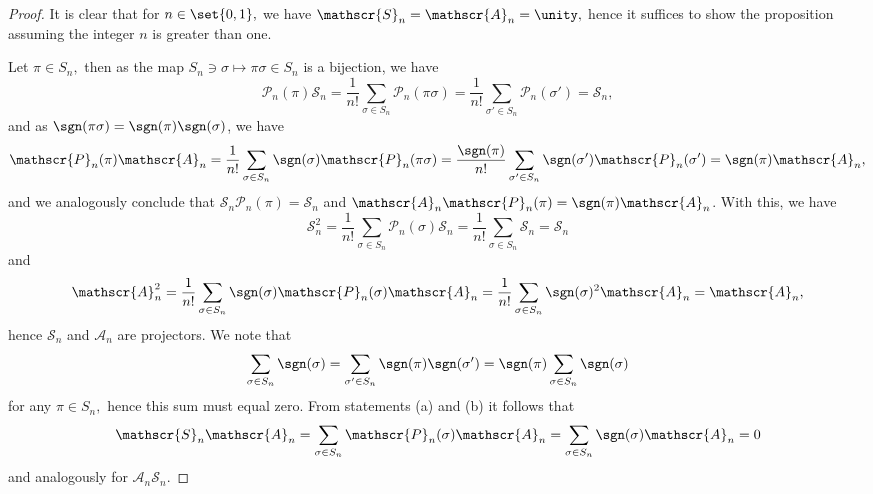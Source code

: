 \begin{proof}
    It is clear that for \(n \in \set{0,1},\) we have \(\mathscr{S}_n = \mathscr{A}_n = \unity,\) hence it suffices to show the proposition assuming the integer \(n\) is greater than one.

    Let \(\pi \in S_n,\) then as the map \(S_n \ni \sigma \mapsto \pi \sigma \in S_n\) is a bijection, we have
    \begin{equation*}
        \mathscr{P}_n(\pi) \mathscr{S}_n = \frac1{n!} \sum_{\sigma \in S_n}{\mathscr{P}_n(\pi\sigma)} = \frac1{n!}\sum_{\sigma' \in S_n}{\mathscr{P}_n(\sigma')} = \mathscr{S}_n,
    \end{equation*}
    and as \(\sgn(\pi \sigma) = \sgn(\pi) \sgn(\sigma)\), we have
    \begin{equation*}
        \mathscr{P}_n(\pi) \mathscr{A}_n = \frac1{n!} \sum_{\sigma \in S_n}{\sgn(\sigma)\mathscr{P}_n(\pi\sigma)} = \frac{\sgn(\pi)}{n!}\sum_{\sigma' \in S_n}{\sgn(\sigma')\mathscr{P}_n(\sigma')} = \sgn(\pi)\mathscr{A}_n,
    \end{equation*}
    and we analogously conclude that \(\mathscr{S}_n \mathscr{P}_n(\pi) = \mathscr{S}_n\) and \(\mathscr{A}_n \mathscr{P}_n(\pi) = \sgn(\pi) \mathscr{A}_n\). With this, we have
    \begin{equation*}
        \mathscr{S}_n^2 = \frac1{n!}\sum_{\sigma \in S_n}{\mathscr{P}_n(\sigma)\mathscr{S}_n} = \frac{1}{n!} \sum_{\sigma \in S_n}{\mathscr{S}_n} = \mathscr{S}_n
    \end{equation*}
    and
    \begin{equation*}
        \mathscr{A}_n^2 = \frac1{n!}\sum_{\sigma \in S_n}{\sgn(\sigma)\mathscr{P}_n(\sigma)\mathscr{A}_n} = \frac{1}{n!} \sum_{\sigma \in S_n}{\sgn(\sigma)^2\mathscr{A}_n} = \mathscr{A}_n,
    \end{equation*}
    hence \(\mathscr{S}_n\) and \(\mathscr{A}_n\) are projectors. We note that
    \begin{equation*}
        \sum_{\sigma \in S_n}{\sgn(\sigma)} = \sum_{\sigma' \in S_n}{\sgn(\pi) \sgn(\sigma')} = \sgn(\pi) \sum_{\sigma \in S_n}{\sgn(\sigma)}
    \end{equation*}
    for any \(\pi \in S_n,\) hence this sum must equal zero. From statements (a) and (b) it follows that
    \begin{equation*}
        \mathscr{S}_n \mathscr{A}_n = \sum_{\sigma \in S_n}{\mathscr{P}_n(\sigma) \mathscr{A}_n} = \sum_{\sigma \in S_n}{\sgn(\sigma) \mathscr{A}_n} = 0
    \end{equation*}
    and analogously for \(\mathscr{A}_n \mathscr{S}_n.\)


\end{proof}
